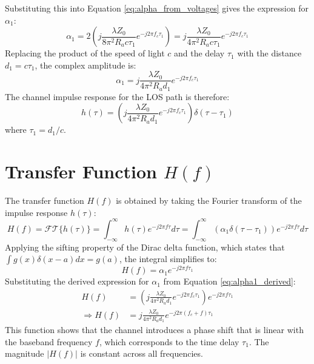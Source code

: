 Substituting this into Equation \ref{eq:alpha_from_voltages} gives the expression for $\alpha_1$:
\begin{equation}
	\alpha_1 = 2 \left( j \frac{\lambda Z_0}{8\pi^2 R_a c\tau_1} e^{-j2\pi f_c \tau_1} \right) = j \frac{\lambda Z_0}{4\pi^2 R_a c\tau_1} e^{-j2\pi f_c \tau_1}
\end{equation}
Replacing the product of the speed of light $c$ and the delay $\tau_1$ with the distance $d_1 = c\tau_1$, the complex amplitude is:
\begin{equation}
	\alpha_1 = j \frac{\lambda Z_0}{4\pi^2 R_a d_1} e^{-j2\pi f_c \tau_1}
	\label{eq:alpha1_derived}
\end{equation}
The channel impulse response for the LOS path is therefore:
\begin{equation}
	h(\tau) = \left( j \frac{\lambda Z_0}{4\pi^2 R_a d_1} e^{-j2\pi f_c \tau_1} \right) \delta(\tau - \tau_1)
	\label{eq:los_impulse_response_derived_detailed}
\end{equation}
where $\tau_1 = d_1/c$.

\section{Transfer Function $H(f)$}
The transfer function $H(f)$ is obtained by taking the Fourier transform of the impulse response $h(\tau)$:
\begin{equation}
	H(f) = \mathcal{FT}\{ h(\tau)\} =  \int_{-\infty}^{\infty} h(\tau) e^{-j2\pi f \tau} d\tau = \int_{-\infty}^{\infty} \left( \alpha_1 \delta(\tau - \tau_1) \right) e^{-j2\pi f \tau} d\tau
\end{equation}
Applying the sifting property of the Dirac delta function, which states that $\int g(x)\delta(x-a)dx = g(a)$, the integral simplifies to:
\begin{equation}
	H(f) = \alpha_1 e^{-j2\pi f \tau_1}
\end{equation}
Substituting the derived expression for $\alpha_1$ from Equation \ref{eq:alpha1_derived}:
\begin{align}
	H(f) &= \left( j \frac{\lambda Z_0}{4\pi^2 R_a d_1} e^{-j2\pi f_c \tau_1} \right) e^{-j2\pi f \tau_1} \\
	\Rightarrow H(f) &= j \frac{\lambda Z_0}{4\pi^2 R_a d_1} e^{-j2\pi (f_c + f) \tau_1}
	\label{eq:los_transfer_function_detailed}
\end{align}
This function shows that the channel introduces a phase shift that is linear with the baseband frequency $f$, which corresponds to the time delay $\tau_1$. The magnitude $|H(f)|$ is constant across all frequencies.

